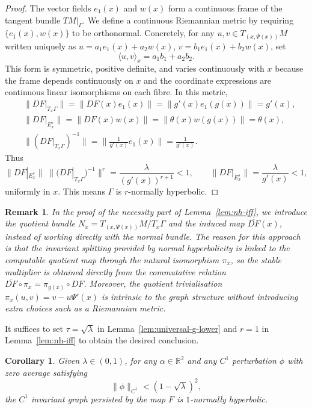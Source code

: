 \documentclass{amsart}
\newtheorem{Corollary}[Theorem]{Corollary}
\newtheorem{Remark}[Theorem]{Remark}
\begin{document}
\begin{proof}
		The vector fields $e_1(x)$ and $w(x)$ form a continuous frame of the tangent bundle
$TM|_\Gamma$.  We define a continuous
Riemannian metric by requiring $\{e_1(x), w(x)\}$ to be orthonormal.  Concretely, for
any $u,v\in T_{(x,\Psi(x))}M$ written uniquely as
$u = a_1 e_1(x) + a_2 w(x)$,\; $v = b_1 e_1(x) + b_2 w(x)$, set
\[
\langle u,v\rangle_x = a_1 b_1 + a_2 b_2.
\]
This form is symmetric, positive definite, and varies continuously with $x$ because the
frame depends continuously on $x$ and the coordinate expressions are continuous linear
isomorphisms on each fibre.  In this metric,
\begin{align*}
&\|DF|_{T_x\Gamma}\| = \|DF(x) e_1(x)\| = \|g'(x) e_1(g(x))\| = g'(x),\\
&\|DF|_{E^s_x}\| = \|DF(x) w(x)\| = \|\theta(x) w(g(x))\| = \theta(x),\\
&\|(DF|_{T_x\Gamma})^{-1}\| = \bigl\| \tfrac{1}{g'(x)} e_1(x) \bigr\| = \frac{1}{g'(x)}.
\end{align*}
		Thus
		\[
		\|DF|_{E^s_x}\|\;\bigl\|(DF|_{T_x\Gamma})^{-1}\bigr\|^r
		= \frac{\lambda}{(g'(x))^{r+1}} < 1,\qquad
		\|DF|_{E^s_x}\| = \frac{\lambda}{g'(x)} < 1,
		\]
		uniformly in $x$. This means $\Gamma$ is $r$-normally hyperbolic.
	\end{proof}
	\begin{Remark}
  In the proof of the necessity part of Lemma~\ref{lem:nh-iff}, we introduce the quotient bundle $N_x = T_{(x,\Psi(x))}M/T_x\Gamma$ and the induced map $\overline{DF}(x)$, instead of working directly with the normal bundle. The reason for this approach is that the invariant splitting provided by normal hyperbolicity is linked to the computable quotient map through the natural isomorphism $\pi_x$, so the stable multiplier is obtained directly from the commutative relation $\overline{DF}\circ\pi_x = \pi_{g(x)}\circ DF$. Moreover, the quotient trivialisation $\pi_x(u,v)=v-u\Psi'(x)$ is intrinsic to the graph structure without introducing extra choices such as a Riemannian metric.
\end{Remark}
	It suffices to set  \( \tau = \sqrt{\lambda} \) in Lemma~\ref{lem:universal-g-lower} and \( r = 1 \) in Lemma~\ref{lem:nh-iff} to obtain the desired conclusion.
	\begin{Corollary}\label{lexx2}
		Given \(\lambda \in (0,1)\), for any \(\alpha \in \mathbb{R}^2\) and any \(C^1\) perturbation \(\phi\) with zero average satisfying
		\begin{equation}\label{m22conx}
			\|\phi\|_{C^1} < (1-\sqrt{\lambda})^2,
		\end{equation}
		the  \(C^1\) invariant graph persisted by the map \(F\)  is \(1\)-normally hyperbolic.
	\end{Corollary}
	
\end{document}
